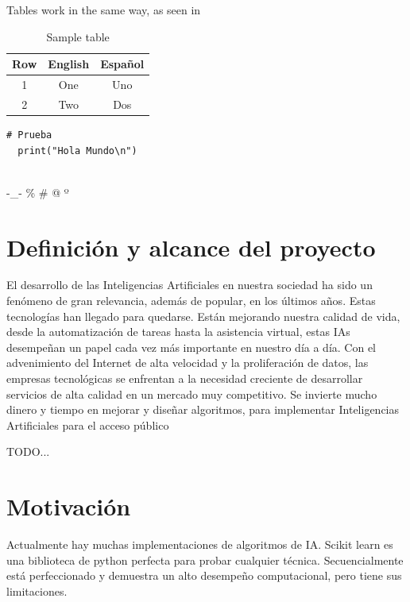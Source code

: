 		
		Tables work in the same way, as seen in 

		\begin{table}
			\centering
			\begin{tabular}{c|c|c}
				Row & English & Español \\\hline\hline
				1 & One & Uno \\
				2 & Two & Dos \\
			\end{tabular}
			\caption{Sample table}
			\label{tab:tabla}
		\end{table}
		
		
		

\lstset{language=python, breaklines=true, basicstyle=\footnotesize}
\begin{lstlisting}[frame=single]
  # Prueba
  print("Hola Mundo\n")
		
\end{lstlisting}
		
		-\_-
		\%
		\#
		@
		º
	
	
	
	
	\newpage %
	\section{Definición y alcance del proyecto}
		El desarrollo de las Inteligencias Artificiales en nuestra sociedad ha sido un fenómeno de gran relevancia, además de popular, en los últimos años. Estas tecnologías han llegado para quedarse. Están mejorando nuestra calidad de vida, desde la automatización de tareas hasta la asistencia virtual, estas IAs desempeñan un papel cada vez más importante en nuestro día a día.
		Con el advenimiento del Internet de alta velocidad y la proliferación de datos, las empresas tecnológicas se enfrentan a la necesidad creciente de desarrollar servicios de alta calidad en un mercado muy competitivo. Se invierte mucho dinero y tiempo en mejorar y diseñar algoritmos, para implementar Inteligencias Artificiales para el acceso público
		
		TODO...
	
	\newpage  %
	\section{Motivación}
		Actualmente hay muchas implementaciones de algoritmos de IA. Scikit learn es una biblioteca de python perfecta para probar cualquier técnica. Secuencialmente está perfeccionado y demuestra un alto desempeño computacional, pero tiene sus limitaciones. 
		

